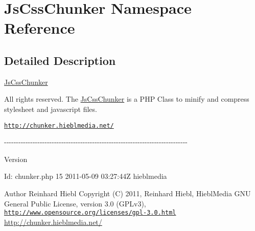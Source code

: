 \hypertarget{namespace_js_css_chunker}{
\section{JsCssChunker Namespace Reference}
\label{namespace_js_css_chunker}
}


\subsection{Detailed Description}
\hyperlink{class_js_css_chunker}{JsCssChunker}

All rights reserved. The \hyperlink{class_js_css_chunker}{JsCssChunker} is a PHP Class to minify and compress stylesheet and javascript files.
\begin{DoxyItemize}
\item \href{http://chunker.hieblmedia.net/}{\tt http://chunker.hieblmedia.net/}
\end{DoxyItemize}

-\/-\/-\/-\/-\/-\/-\/-\/-\/-\/-\/-\/-\/-\/-\/-\/-\/-\/-\/-\/-\/-\/-\/-\/-\/-\/-\/-\/-\/-\/-\/-\/-\/-\/-\/-\/-\/-\/-\/-\/-\/-\/-\/-\/-\/-\/-\/-\/-\/-\/-\/-\/-\/-\/-\/-\/-\/-\/-\/-\/-\/-\/-\/-\/-\/-\/-\/-\/-\/-\/-\/-\/-\/-\/-\/-\/-\/

\begin{DoxyVersion}{Version}

\end{DoxyVersion}
\begin{DoxyParagraph}{Id:}
chunker.php 15 2011-\/05-\/09 03:27:44Z hieblmedia 
\end{DoxyParagraph}


\begin{DoxyAuthor}{Author}
Reinhard Hiebl  Copyright (C) 2011, Reinhard Hiebl, HieblMedia  GNU General Public License, version 3.0 (GPLv3), \href{http://www.opensource.org/licenses/gpl-3.0.html}{\tt http://www.opensource.org/licenses/gpl-\/3.0.html} \hyperlink{}{http://chunker.hieblmedia.net/}
\end{DoxyAuthor}
